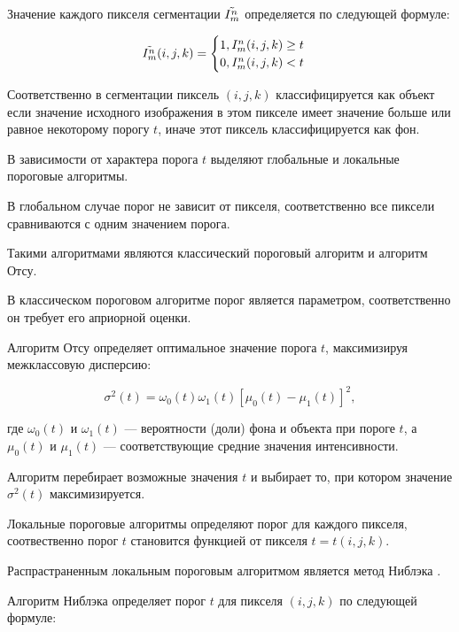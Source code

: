 Значение каждого пикселя сегментации \(\tilde{I^n_m}\) определяется по следующей формуле:

\begin{equation} \label{eq:classicthresholding}
    \tilde{I^n_m} (i, j, k) = 
    \begin{cases}
        1, I^n_m(i, j, k) \geq t\\
        0, I^n_m(i, j, k) < t
    \end{cases}
\end{equation}

Соответственно в сегментации пиксель \((i, j, k)\) классифицируется как объект если значение исходного изображения в этом пикселе имеет значение больше или равное некоторому порогу \(t\), иначе этот пиксель классифицируется как фон.

В зависимости от характера порога \(t\) выделяют глобальные и локальные пороговые алгоритмы.

В глобальном случае порог не зависит от пикселя, соответственно все пиксели сравниваются с одним значением порога.

Такими алгоритмами являются классический пороговый алгоритм и алгоритм Отсу.

В классическом пороговом алгоритме порог является параметром, соответственно он требует его априорной оценки.

Алгоритм Отсу \cite{otsu1975threshold} определяет оптимальное значение порога \(t\), максимизируя межклассовую дисперсию:

\begin{equation}
    \sigma^2(t) = \omega_0(t) \omega_1(t) \left[ \mu_0(t) - \mu_1(t) \right]^2,
\end{equation}

где \(\omega_0(t)\) и \(\omega_1(t)\) — вероятности (доли) фона и объекта при пороге \(t\), а \(\mu_0(t)\) и \(\mu_1(t)\) — соответствующие средние значения интенсивности.

Алгоритм перебирает возможные значения \(t\) и выбирает то, при котором значение \(\sigma^2(t)\) максимизируется. 

Локальные пороговые алгоритмы определяют порог для каждого пикселя, соотвественно порог \(t\) становится функцией от пикселя \(t = t(i, j, k)\).

Распрастраненным локальным пороговым алгоритмом является метод Ниблэка \cite{niblack1985introduction}.

Алгоритм Ниблэка определяет порог \(t\) для пикселя \((i, j, k)\) по следующей формуле:

